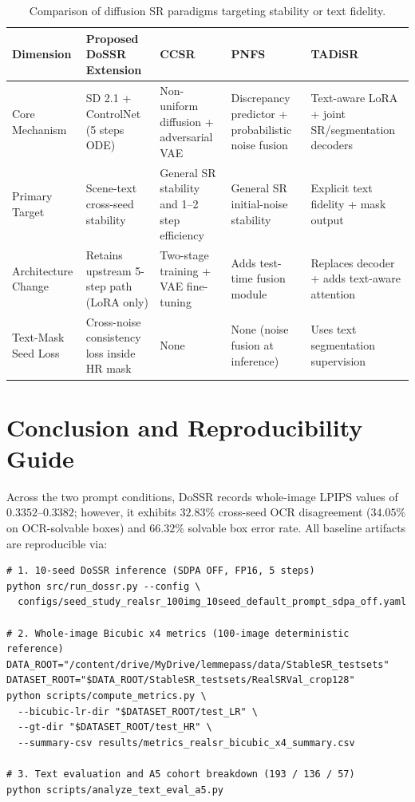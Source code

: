 \documentclass[11pt]{article}
\begin{document}
\begin{table}[ht]
\centering
\small
\caption{Comparison of diffusion SR paradigms targeting stability or text fidelity.}
\label{tab:related_methods}
\begin{tabularx}{\textwidth}{lYYYY}
\toprule
Dimension & Proposed DoSSR Extension & CCSR~\cite{sun2024ccsr} & PNFS~\cite{jiang2025pnfs} & TADiSR~\cite{hu2025tadIsr} \\
\midrule
Core Mechanism & SD 2.1 + ControlNet (5 steps ODE) & Non-uniform diffusion + adversarial VAE & Discrepancy predictor + probabilistic noise fusion & Text-aware LoRA + joint SR/segmentation decoders \\
Primary Target & Scene-text cross-seed stability & General SR stability and 1--2 step efficiency & General SR initial-noise stability & Explicit text fidelity + mask output \\
Architecture Change & Retains upstream 5-step path (LoRA only) & Two-stage training + VAE fine-tuning & Adds test-time fusion module & Replaces decoder + adds text-aware attention \\
Text-Mask Seed Loss & Cross-noise consistency loss inside HR mask & None & None (noise fusion at inference) & Uses text segmentation supervision \\
\bottomrule
\end{tabularx}
\end{table}

\section{Conclusion and Reproducibility Guide}
Across the two prompt conditions, DoSSR records whole-image LPIPS values of $0.3352$--$0.3382$; however, it exhibits $32.83\%$ cross-seed OCR disagreement ($34.05\%$ on OCR-solvable boxes) and $66.32\%$ solvable box error rate. All baseline artifacts are reproducible via:
\begin{verbatim}
# 1. 10-seed DoSSR inference (SDPA OFF, FP16, 5 steps)
python src/run_dossr.py --config \
  configs/seed_study_realsr_100img_10seed_default_prompt_sdpa_off.yaml

# 2. Whole-image Bicubic x4 metrics (100-image deterministic reference)
DATA_ROOT="/content/drive/MyDrive/lemmepass/data/StableSR_testsets"
DATASET_ROOT="$DATA_ROOT/StableSR_testsets/RealSRVal_crop128"
python scripts/compute_metrics.py \
  --bicubic-lr-dir "$DATASET_ROOT/test_LR" \
  --gt-dir "$DATASET_ROOT/test_HR" \
  --summary-csv results/metrics_realsr_bicubic_x4_summary.csv

# 3. Text evaluation and A5 cohort breakdown (193 / 136 / 57)
python scripts/analyze_text_eval_a5.py
\end{verbatim}
\end{document}

